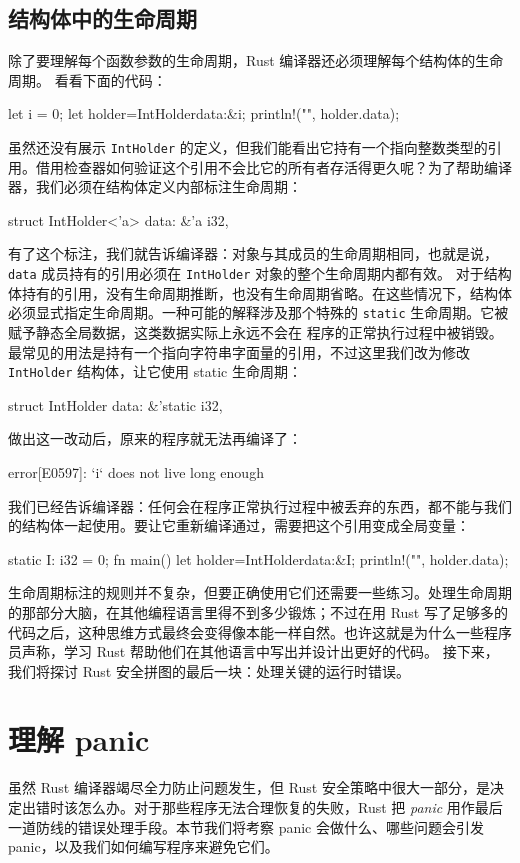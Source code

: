 \subsection{结构体中的生命周期}
\label{idx:idx_6be4fc38}
除了要理解每个函数参数的生命周期，Rust 编译器还必须理解每个结构体的生命周期。
看看下面的代码：
\begin{codebox}[rust]
let i = 0;
let holder=IntHolder{data:&i};
println!("{}", holder.data);
\end{codebox}
虽然还没有展示 \texttt{IntHolder} 的定义，但我们能看出它持有一个指向整数类型的引用。借用检查器如何验证这个引用不会比它的所有者存活得更久呢？为了帮助编译器，我们必须在结构体定义内部标注生命周期：
\begin{codebox}[rust]
struct IntHolder<'a> {
    data: &'a i32,
}
\end{codebox}
有了这个标注，我们就告诉编译器：对象与其成员的生命周期相同，也就是说，\texttt{data} 成员持有的引用必须在 \texttt{IntHolder} 对象的整个生命周期内都有效。
对于结构体持有的引用，没有生命周期推断，也没有生命周期省略。在这些情况下，结构体必须显式指定生命周期。一种可能的解释涉及那个特殊的
\texttt{static} 生命周期。它被赋予静态全局数据，这类数据实际上永远不会在
程序的正常执行过程中被销毁。最常见的用法是持有一个指向字符串字面量的引用，不过这里我们改为修改 \texttt{IntHolder} 结构体，让它使用 static 生命周期：
\begin{codebox}[rust]
struct IntHolder {
    data: &'static i32,
}
\end{codebox}
做出这一改动后，原来的程序就无法再编译了：
\begin{codeboxdark}
error[E0597]: `i` does not live long enough
\end{codeboxdark}
\label{idx:idx_1cb7f6bc}
我们已经告诉编译器：任何会在程序正常执行过程中被丢弃的东西，都不能与我们的结构体一起使用。要让它重新编译通过，需要把这个引用变成全局变量：
\begin{codebox}[rust]
static I: i32 = 0;
fn main() {
    let holder=IntHolder{data:&I};
    println!("{}", holder.data);
}
\end{codebox}
生命周期标注的规则并不复杂，但要正确使用它们还需要一些练习。处理生命周期的那部分大脑，在其他编程语言里得不到多少锻炼；不过在用 Rust 写了足够多的代码之后，这种思维方式最终会变得像本能一样自然。也许这就是为什么一些程序员声称，学习 Rust 帮助他们在其他语言中写出并设计出更好的代码。
接下来，我们将探讨 Rust 安全拼图的最后一块：处理关键的运行时错误。
\section{理解 panic}
\label{idx:idx_b5a9aae9}
虽然 Rust 编译器竭尽全力防止问题发生，但 Rust 安全策略中很大一部分，是决定出错时该怎么办。对于那些程序无法合理恢复的失败，Rust 把 \emph{panic} 用作最后一道防线的错误处理手段。本节我们将考察 panic 会做什么、哪些问题会引发 panic，以及我们如何编写程序来避免它们。
